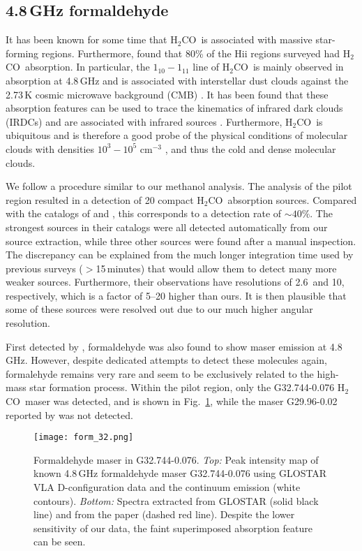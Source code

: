\documentclass{aa}
\newcommand{\form}{\mbox{H$_{2}$CO}~}
\begin{document}
\subsection{4.8\,GHz formaldehyde}
It has been known for some time  that \form is associated with massive star-forming regions. Furthermore, \cite{downes1980} found that 80\% of the H{\sc ii} regions
surveyed had \form absorption. In particular, the $1_{10}-1_{11}$ line of \form is mainly observed in
absorption at 4.8\,GHz and is associated with interstellar dust clouds against the 2.73\,K
cosmic microwave background (CMB) \citep{snyder1969}. It has been found that these absorption 
features can be used to trace the kinematics of infrared dark clouds (IRDCs) and are associated 
with infrared sources \citep{okoh2014}. Furthermore, \form is ubiquitous and is 
therefore a good probe of the physical conditions of molecular clouds with densities 
$10^3-10^5$ cm$^{-3}$ \citep{mangum1993}, and thus the cold and dense molecular clouds.

We follow a procedure similar to our methanol analysis.
The analysis of the pilot region  resulted in a detection of 20 compact \form absorption sources. 
Compared with the catalogs of \cite{downes1980} and \cite{okoh2014}, this corresponds to
a detection rate of $\sim40\%$. The strongest sources in their catalogs were all detected
automatically from our source extraction, while three other  sources were found after a manual inspection.
The discrepancy can be explained from the much longer integration time used by previous
surveys ($>$15\,minutes) that would allow them to detect many more weaker sources. Furthermore, their observations have resolutions
of 2.6\arcmin\ and 10\arcmin, respectively, which is a factor of 5--20 higher than ours. It is then plausible that some of these sources were resolved out due to our much higher 
angular resolution.

First detected by \cite{downes1974}, formaldehyde was also found to show maser emission at 4.8\,GHz.
However, despite dedicated attempts to detect these molecules again, formalehyde remains very rare and seem to
be exclusively
related to the high-mass star formation process. Within the pilot region, only the G32.744-0.076 \form maser \citep{araya2015} was detected, and is shown in Fig.~\ref{fig:form_maser}, while the maser G29.96-0.02 reported by \cite{pratap1994} was not detected.






\begin{figure}
        \texttt{[image: form\_32.png]}
        \caption{Formaldehyde maser in G32.744-0.076. \textit{Top:} Peak intensity map of known 4.8\,GHz formaldehyde maser G32.744-0.076 \citep{araya2015} using GLOSTAR VLA D-configuration data and the continuum emission (white contours). \textit{Bottom:} Spectra extracted from GLOSTAR (solid black line) and  from the \cite{araya2015} paper (dashed red line). Despite the lower sensitivity of our data,  the  faint superimposed absorption feature can be seen.}
        \label{fig:form_maser}
\end{figure}
\end{document}
